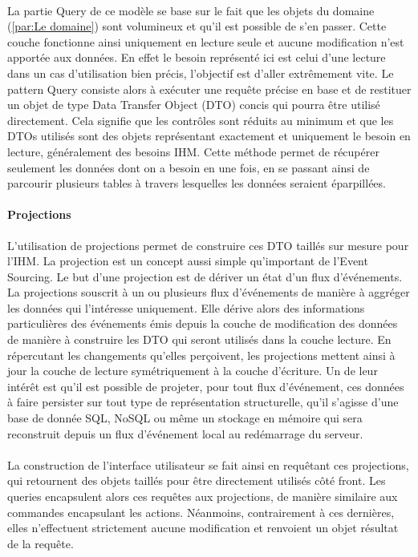 \paragraph{}
La partie Query de ce modèle se base sur le fait que les objets du domaine (\ref{par:Le domaine}) sont volumineux et qu'il est possible de s'en passer.
Cette couche fonctionne ainsi uniquement en lecture seule et aucune modification n'est apportée aux données.
En effet le besoin représenté ici est celui d'une lecture dans un cas d'utilisation bien précis, l'objectif est d'aller extrêmement vite.
Le pattern Query consiste alors à exécuter une requête précise en base et de restituer un objet de type Data Transfer Object (DTO) concis qui pourra être utilisé directement.
Cela signifie que les contrôles sont réduits au minimum et que les DTOs utilisés sont des objets représentant exactement et uniquement le besoin en lecture, généralement des besoins IHM.
Cette méthode permet de récupérer seulement les données dont on a besoin en une fois, en se passant ainsi de parcourir plusieurs tables à travers lesquelles les données seraient éparpillées.
\paragraph{Projections}
L'utilisation de projections permet de construire ces DTO taillés sur mesure pour l'IHM.
La projection est un concept aussi simple qu'important de l'Event Sourcing.
Le but d'une projection est de dériver un état d'un flux d'événements.
La projections souscrit à un ou plusieurs flux d'événements de manière à aggréger les données qui l'intéresse uniquement.
Elle dérive alors des informations particulières des événements émis depuis la couche de modification des données de manière à construire les DTO qui seront utilisés dans la couche lecture.
En répercutant les changements qu'elles perçoivent, les projections mettent ainsi à jour la couche de lecture symétriquement à la couche d'écriture.
Un de leur intérêt est qu'il est possible de projeter, pour tout flux d'événement, ces données à faire persister sur tout type de représentation structurelle, qu'il s'agisse d'une base de donnée SQL, NoSQL ou même un stockage en mémoire qui sera reconstruit depuis un flux d'événement local au redémarrage du serveur.
\paragraph{}
La construction de l'interface utilisateur se fait ainsi en requêtant ces projections, qui retournent des objets taillés pour être directement utilisés côté front.
Les queries encapsulent alors ces requêtes aux projections, de manière similaire aux commandes encapsulant les actions.
Néanmoins, contrairement à ces dernières, elles n'effectuent strictement aucune modification et renvoient un objet résultat de la requête.
